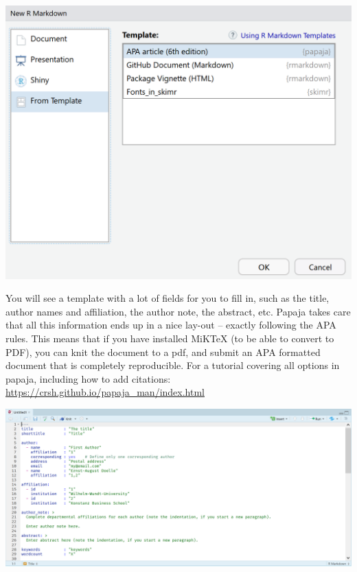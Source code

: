 \documentclass[
  oneside]{krantz}
\begin{document}
\begin{center}\includegraphics[width=1\linewidth]{images/b4edc7f85821527cd6f98a1c76dfc47d} \end{center}

You will see a template with a lot of fields for you to fill in, such as the
title, author names and affiliation, the author note, the abstract, etc. Papaja
takes care that all this information ends up in a nice lay-out -- exactly
following the APA rules. This means that if you have installed MiKTeX (to be
able to convert to PDF), you can knit the document to a pdf, and submit an APA
formatted document that is completely reproducible. For a tutorial covering all
options in papaja, including how to add citations:
\url{https://crsh.github.io/papaja_man/index.html}

\begin{center}\includegraphics[width=1\linewidth]{images/50d0fc917605c24a8839a66437f9c18b} \end{center}
\end{document}
